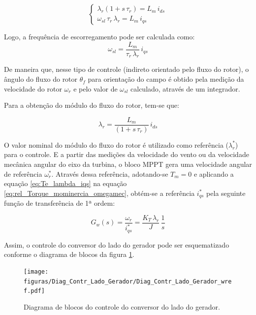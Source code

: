 \begin{equation}
\left\{\begin{matrix}
  \lambda_{r}(1 + s\,\tau_r) = L_m\,i_{ds}
\\ 
  \omega_{sl}\,\tau_r\,\lambda_{r} = L_m\,i_{qs}
\end{matrix}\right.
\end{equation}

Logo, a frequência de escorregamento pode ser calculada como:
\begin{equation}
\label{eq:omega_sl}
  \omega_{sl} = \frac{L_m}{\tau_r\,\lambda_r}\,i_{qs}
\end{equation}

De maneira que, nesse tipo de controle (indireto orientado pelo fluxo do rotor), o ângulo do fluxo do rotor $ \theta_f $ para orientação do campo é obtido pela medição da velocidade do rotor $ \omega_r $ e pelo valor de $\omega_{sl}$ calculado, através de um integrador.

Para a obtenção do módulo do fluxo do rotor, tem-se que:

\begin{equation}
\label{eq:lambda_r}
  \lambda_{r} = \frac{L_m}{(1 + s\,\tau_r)}\,i_{ds}
\end{equation}

O valor nominal do módulo do fluxo do rotor é utilizado como referência ($\lambda_r^*$) para o controle. 
E a partir das medições da velocidade do vento ou da velocidade mecânica angular do eixo da turbina, o bloco \ac{MPPT} gera uma velocidade angular de referência $\omega_r^*$. Através dessa referência, adotando-se $T_m = 0$ e aplicando a equação \ref{eq:Te_lambda_iqs} na equação \ref{eq:rel_Torque_mominercia_omegamec}, obtém-se a referência $i_{qs}^*$ pela seguinte função de transferência de 1ª ordem:

\begin{equation}
\label{eq:fctr_omega_iqs}
  G_w(s) = \frac{\omega_r}{i_{qs}^*} = \frac{K_T\,\lambda_r}{J}\,\frac{1}{s}
\end{equation}

Assim, o controle do conversor do lado do gerador pode ser esquematizado conforme o diagrama de blocos da figura \ref{fig:diag_contr_conv_gerador}.



\begin{figure}[htb]
	\begin{center}
    \caption{Diagrama de blocos do controle do conversor do lado do gerador.}
    \texttt{[image: figuras/Diag\_Contr\_Lado\_Gerador/Diag\_Contr\_Lado\_Gerador\_wref.pdf]} 
	\end{center}
    \label{fig:diag_contr_conv_gerador}
\end{figure}



